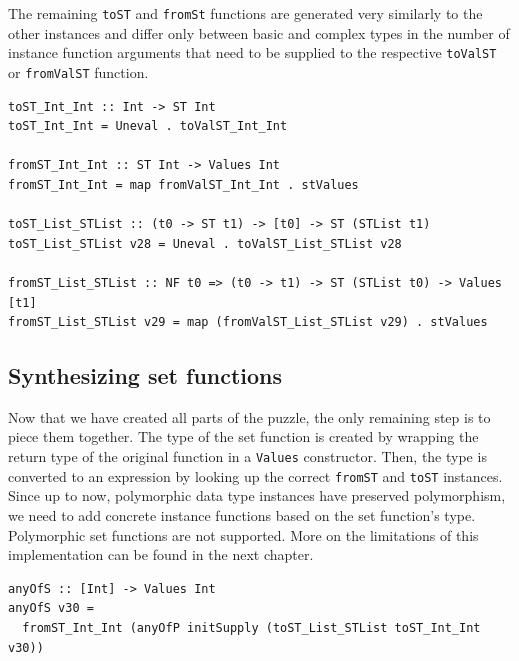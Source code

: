 \documentclass[a4paper, 11pt, fleqn]{scrreprt}
\newcommand{\cinline}[1]{\texttt{#1}}
\begin{document}
The remaining \cinline{toST} and \cinline{fromSt} functions are generated very similarly to the other instances and differ only between basic and complex types in the number of instance function arguments that need to be supplied to the respective \cinline{toValST} or \cinline{fromValST} function.

\begin{verbatim}
toST_Int_Int :: Int -> ST Int
toST_Int_Int = Uneval . toValST_Int_Int

fromST_Int_Int :: ST Int -> Values Int
fromST_Int_Int = map fromValST_Int_Int . stValues

toST_List_STList :: (t0 -> ST t1) -> [t0] -> ST (STList t1)
toST_List_STList v28 = Uneval . toValST_List_STList v28

fromST_List_STList :: NF t0 => (t0 -> t1) -> ST (STList t0) -> Values [t1]
fromST_List_STList v29 = map (fromValST_List_STList v29) . stValues
\end{verbatim}

\subsection{Synthesizing set functions}
Now that we have created all parts of the puzzle, the only remaining step is to piece them together. The type of the set function is created by wrapping the return type of the original function in a \cinline{Values} constructor. Then, the type is converted to an expression by looking up the correct \cinline{fromST} and \cinline{toST} instances. Since up to now, polymorphic data type instances have preserved polymorphism, we need to add concrete instance functions based on the set function's type. Polymorphic set functions are not supported. More on the limitations of this implementation can be found in the next chapter.

\begin{verbatim}
anyOfS :: [Int] -> Values Int
anyOfS v30 =
  fromST_Int_Int (anyOfP initSupply (toST_List_STList toST_Int_Int v30))
\end{verbatim}
\end{document}
